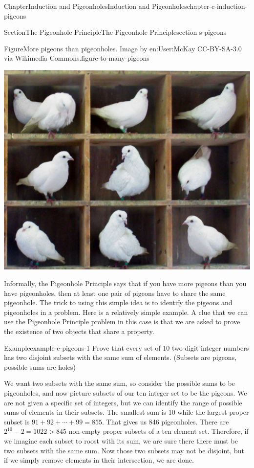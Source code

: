 \documentclass[oneside,10pt,]{book}
\numberwithin{equation}{section}
\begin{document}
\begin{chapterptx}{Chapter}{Induction and Pigeonholes}{}{Induction and Pigeonholes}{}{}{chapter-c-induction-pigeons}
\begin{sectionptx}{Section}{The Pigeonhole Principle}{}{The Pigeonhole Principle}{}{}{section-s-pigeons}
\begin{figureptx}{Figure}{More pigeons than pigeonholes.  Image by en:User:McKay CC-BY-SA-3.0 via Wikimedia Commons.}{figure-to-many-pigeons}{}%
\begin{image}{0}{1}{0}{}%
\includegraphics[width=\linewidth]{images/TooManyPigeons.jpg}
\end{image}%
\tcblower
\end{figureptx}%
Informally, the Pigeonhole Principle says that if you have more pigeons than you have pigeonholes, then at least one pair of pigeons have to share the same pigeonhole. The trick to using this simple idea is to identify the pigeons and pigeonholes in a problem.  Here is a relatively simple example. A clue that we can use the Pigeonhole Principle problem in this case is that we are asked to prove the existence of two objects that share a property.%
\begin{example}{Example}{}{example-e-pigeons-1}%
Prove that every set of 10 two-digit integer numbers has two disjoint subsets with the same sum of elements. (Subsets are pigeons, possible sums are holes)%
\par
We want two subsets with the same sum, so consider the possible sums to be pigeonholes, and now picture subsets of our ten integer set to be the pigeons. We are not given a specific set of integers, but we can identify the range of possible sums of elements in their subsets.  The smallest sum is 10 while the largest proper subset is \(91+92+\cdots+99 =855 \). That gives us 846 pigeonholes.  There are \(2^{10}-2 = 1022 > 845\) non-empty proper subsets of a ten element set.  Therefore, if we imagine each subset to roost with its sum, we are sure there there must be two subsets with the same sum.  Now those two subsets may not be disjoint, but if we simply remove elements in their intersection, we are done.%

\end{example}
\end{sectionptx}
\end{chapterptx}
\end{document}
